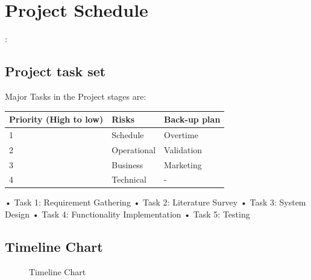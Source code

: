 \documentclass[oneside,a4paper,12pt]{report}
\begin{document}
{\newpage
\section{Project Schedule}:
\subsection{Project task set}
Major Tasks in the Project stages are:
\newline

\def\arraystretch{1.5}
  \begin{tabular}{| p{3cm} | p{3cm} |p{3cm}|}
\hline
\textbf{Priority (High to low)}	&\textbf{Risks}	&\textbf{Back-up plan}	 \\ \hline  
1	&Schedule	&Overtime	    \\ \hline 
2	&Operational	&Validation	   \\ \hline  
3	&Business	&Marketing	    \\ \hline 
4	&Technical	&-	  \\ \hline 
\end{tabular}
\newline\newline\newline
•	Task 1: Requirement Gathering\newline
•	Task 2: Literature Survey\newline
•	Task 3: System Design\newline
•	Task 4: Functionality Implementation\newline
•	Task 5: Testing
\subsection{Timeline Chart}
\begin{center}
	\begin{figure}[!htbp]
	
		  \caption{Timeline Chart}
	 

\end{figure}
\end{center}}
\end{document}
